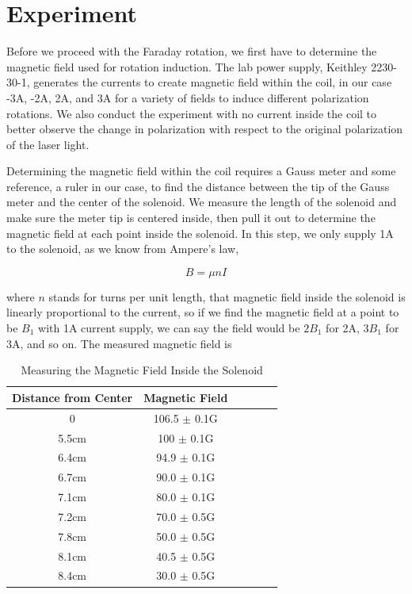 \documentclass[prb,preprint]{revtex4-1}
\begin{document}
\section{Experiment}

Before we proceed with the Faraday rotation, we first have to determine the magnetic field used for rotation induction. The lab power supply, Keithley 2230-30-1, generates the currents to create magnetic field within the coil, in our case -3A, -2A, 2A, and 3A for a variety of fields to induce different polarization rotations. We also conduct the experiment with no current inside the coil to better observe the change in polarization with respect to the original polarization of the laser light.

Determining the magnetic field within the coil requires a Gauss meter and some reference, a ruler in our case, to find the distance between the tip of the Gauss meter and the center of the solenoid. We measure the length of the solenoid and make sure the meter tip is centered inside, then pull it out to determine the magnetic field at each point inside the solenoid. In this step, we only supply 1A to the solenoid, as we know from Ampere's law,

\begin{equation}
\label{Ampere}
B=\mu nI
\end{equation}

where $n$ stands for turns per unit length, that magnetic field inside the solenoid is linearly proportional to the current, so if we find the magnetic field at a point to be $B_1$ with 1A current supply, we can say the field would be $2B_1$ for 2A, $3B_1$ for 3A, and so on. The measured magnetic field is

\begin{table}[H]
\centering
\caption{Measuring the Magnetic Field Inside the Solenoid}
\begin{ruledtabular}
\begin{tabular}{c c c c c c}
Distance from Center & Magnetic Field\\
\hline
0                    & 106.5 $\pm$ 0.1G \\ 
5.5cm                & 100 $\pm$ 0.1G   \\ 
6.4cm                & 94.9 $\pm$ 0.1G  \\ 
6.7cm                & 90.0 $\pm$ 0.1G  \\ 
7.1cm                & 80.0 $\pm$ 0.1G  \\ 
7.2cm                & 70.0 $\pm$ 0.5G  \\ 
7.8cm                & 50.0 $\pm$ 0.5G  \\ 
8.1cm                & 40.5 $\pm$ 0.5G  \\ 
8.4cm                & 30.0 $\pm$ 0.5G  \\ 

\end{tabular}
\end{ruledtabular}
\label{AnglevsB}
\end{table}
\end{document}

